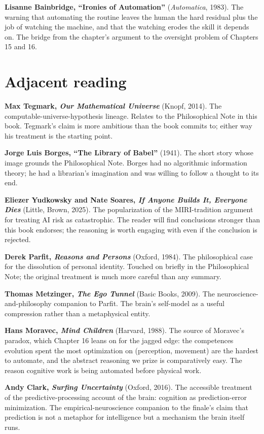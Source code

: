 \textbf{Lisanne Bainbridge, ``Ironies of Automation''} (\textit{Automatica}, 1983). The warning that automating the routine leaves the human the hard residual plus the job of watching the machine, and that the watching erodes the skill it depends on. The bridge from the chapter's argument to the oversight problem of Chapters 15 and 16.

\section*{Adjacent reading}

\textbf{Max Tegmark, \textit{Our Mathematical Universe}} (Knopf, 2014). The computable-universe-hypothesis lineage. Relates to the Philosophical Note in this book. Tegmark's claim is more ambitious than the book commits to; either way his treatment is the starting point.

\textbf{Jorge Luis Borges, ``The Library of Babel''} (1941). The short story whose image grounds the Philosophical Note. Borges had no algorithmic information theory; he had a librarian's imagination and was willing to follow a thought to its end.

\textbf{Eliezer Yudkowsky and Nate Soares, \textit{If Anyone Builds It, Everyone Dies}} (Little, Brown, 2025). The popularization of the MIRI-tradition argument for treating AI risk as catastrophic. The reader will find conclusions stronger than this book endorses; the reasoning is worth engaging with even if the conclusion is rejected.

\textbf{Derek Parfit, \textit{Reasons and Persons}} (Oxford, 1984). The philosophical case for the dissolution of personal identity. Touched on briefly in the Philosophical Note; the original treatment is much more careful than any summary.

\textbf{Thomas Metzinger, \textit{The Ego Tunnel}} (Basic Books, 2009). The neuroscience-and-philosophy companion to Parfit. The brain's self-model as a useful compression rather than a metaphysical entity.

\textbf{Hans Moravec, \textit{Mind Children}} (Harvard, 1988). The source of Moravec's paradox, which Chapter 16 leans on for the jagged edge: the competences evolution spent the most optimization on (perception, movement) are the hardest to automate, and the abstract reasoning we prize is comparatively easy. The reason cognitive work is being automated before physical work.

\textbf{Andy Clark, \textit{Surfing Uncertainty}} (Oxford, 2016). The accessible treatment of the predictive-processing account of the brain: cognition as prediction-error minimization. The empirical-neuroscience companion to the finale's claim that prediction is not a metaphor for intelligence but a mechanism the brain itself runs.

